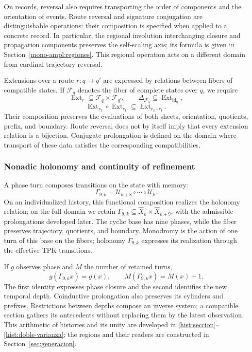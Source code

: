 On records, reversal also requires transporting the order of components
and the orientation of events. Route reversal and signature conjugation
are distinguishable operations: their composition is specified when
applied to a concrete record. In particular, the regional involution
interchanging closure and propagation components preserves the self-scaling
axis; its formula is given in Section~\ref{mono-ampl:regiones}.
This regional operation acts on a different domain from cardinal
trajectory reversal.

Extensions over a route \(r:q\to q'\) are expressed by
relations between fibers of compatible states. If \(\mathcal F_q\)
denotes the fiber of complete states over \(q\), we require
\[
 \operatorname{Ext}_r\subseteq\mathcal F_q\times\mathcal F_{q'},
 \qquad \Delta_{\mathcal F_q}\subseteq
        \operatorname{Ext}_{\operatorname{id}_q},
\]
\[
 \operatorname{Ext}_{r_2}\circ\operatorname{Ext}_{r_1}
       \subseteq\operatorname{Ext}_{r_2\circ r_1}.
\]
Their composition preserves the evaluations of both sheets, orientation,
quotients, prefix, and boundary. Route reversal does not by itself imply
that every extension relation is a bijection. Conjugate prolongation
is defined on the domain where transport of these data satisfies
the corresponding compatibilities.

\subsubsection{Nonadic holonomy and continuity of refinement}
\label{tpk-int:holonomia}

A phase turn composes transitions on the state with memory:
\begin{equation}
 \Gamma_{9,k}=\mathcal U_{k+8}\circ\cdots\circ\mathcal U_k.
 \label{tpk-int:gamma}
\end{equation}
On an individualized history, this functional composition realizes
the holonomy relation; on the full domain we retain
\(\Gamma_{9,k}\subseteq\widehat X_k\times\widehat X_{k+9}\),
with the admissible prolongations developed later.
The cyclic base has nine phases, while the fiber preserves trajectory,
quotients, and boundary. Monodromy is the action of one turn of this
base on the fibers; holonomy \(\Gamma_{9,k}\) expresses its
realization through the effective TPK transitions.

If \(g\) observes phase and \(M\) the number of retained turns,
\[
 g(\Gamma_{9,k}x)=g(x),\qquad M(\Gamma_{9,k}x)=M(x)+1.
\]
The first identity expresses phase closure and the second identifies
the new temporal depth. Coinductive prolongation also preserves its
cylinders and prefixes. Restrictions between depths compose an inverse
system; a compatible section gathers its antecedents without replacing
them by the latest observation. This arithmetic of histories and its
unity are developed in \ref{hist:seccion}--\ref{hist:doble-varianza};
the regions and their readers are constructed in Section~\ref{sec:generacion}.

